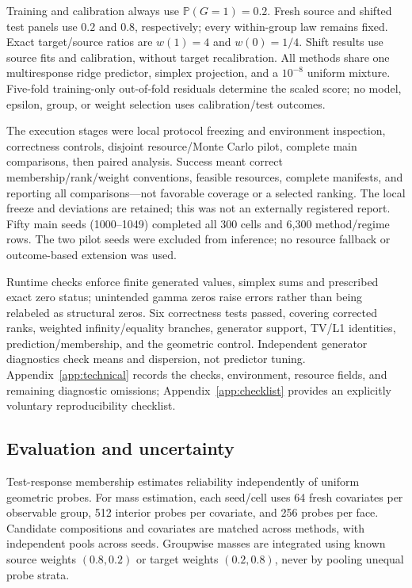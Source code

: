 \documentclass{article}
\theoremstyle{plain}
\newcommand{\Prob}{\mathbb{P}}
\begin{document}
Training and calibration always use $\Prob(G=1)=0.2$. Fresh source and shifted test panels use $0.2$ and $0.8$, respectively; every within-group law remains fixed. Exact target/source ratios are $w(1)=4$ and $w(0)=1/4$. Shift results use source fits and calibration, without target recalibration. All methods share one multiresponse ridge predictor, simplex projection, and a $10^{-8}$ uniform mixture. Five-fold training-only out-of-fold residuals determine the scaled score; no model, epsilon, group, or weight selection uses calibration/test outcomes.

The execution stages were local protocol freezing and environment inspection, correctness controls, disjoint resource/Monte Carlo pilot, complete main comparisons, then paired analysis. Success meant correct membership/rank/weight conventions, feasible resources, complete manifests, and reporting all comparisons---not favorable coverage or a selected ranking. The local freeze and deviations are retained; this was not an externally registered report. Fifty main seeds (1000--1049) completed all 300 cells and 6,300 method/regime rows. The two pilot seeds were excluded from inference; no resource fallback or outcome-based extension was used.

Runtime checks enforce finite generated values, simplex sums and prescribed exact zero status; unintended gamma zeros raise errors rather than being relabeled as structural zeros. Six correctness tests passed, covering corrected ranks, weighted infinity/equality branches, generator support, TV/L1 identities, prediction/membership, and the geometric control. Independent generator diagnostics check means and dispersion, not predictor tuning. Appendix~\ref{app:technical} records the checks, environment, resource fields, and remaining diagnostic omissions; Appendix~\ref{app:checklist} provides an explicitly voluntary reproducibility checklist.

\subsection{Evaluation and uncertainty}
Test-response membership estimates reliability independently of uniform geometric probes. For mass estimation, each seed/cell uses 64 fresh covariates per observable group, 512 interior probes per covariate, and 256 probes per face. Candidate compositions and covariates are matched across methods, with independent pools across seeds. Groupwise masses are integrated using known source weights $(0.8,0.2)$ or target weights $(0.2,0.8)$, never by pooling unequal probe strata.
\end{document}
